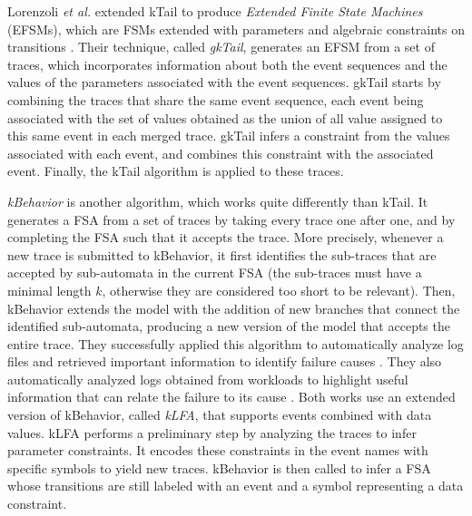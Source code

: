 Lorenzoli \emph{et al.} extended kTail to produce \textit{Extended
Finite State Machines} (EFSMs), which are FSMs extended with
parameters and algebraic constraints on transitions
\cite{Lorenzoli2008}. Their technique, called \textit{gkTail},
generates an EFSM from a set of traces, which incorporates
information about both the event sequences and the values of the
parameters associated with the event sequences. gkTail starts by
combining the traces that share the same event sequence, each
event being associated with the set of values obtained as the
union of all value assigned to this same event in each merged
trace. gkTail infers a constraint from the values associated with
each event, and combines this constraint with the associated
event. Finally, the kTail algorithm is applied to these traces.

\textit{kBehavior} \cite{mariani2007dynamic} is another
algorithm, which works quite differently than kTail. It generates
a FSA from a set of traces by taking every trace one after one,
and by completing the FSA such that it accepts the trace. More
precisely, whenever a new trace is submitted to kBehavior, it
first identifies the sub-traces that are accepted by sub-automata
in the current FSA (the sub-traces must have a minimal length
$k$, otherwise they are considered too short to be relevant).
Then, kBehavior extends the model with the addition of new
branches that connect the identified sub-automata,
producing a new version of the model that accepts the entire
trace. They successfully applied this algorithm to automatically
analyze log files and retrieved important information to identify
failure causes \cite{4700316}. They also automatically analyzed
logs obtained from workloads to highlight useful information that
can relate the failure to its cause
\cite{cotroneo2007investigation}. Both works
\cite{4700316,cotroneo2007investigation} use an extended version
of kBehavior, called \textit{kLFA}, that supports events
combined with data values. kLFA performs a preliminary step by
analyzing the traces to infer parameter constraints. It encodes
these constraints in the event names with specific symbols to
yield new traces. kBehavior is then called to infer a FSA whose
transitions are still labeled with an event and a symbol
representing a data constraint.

